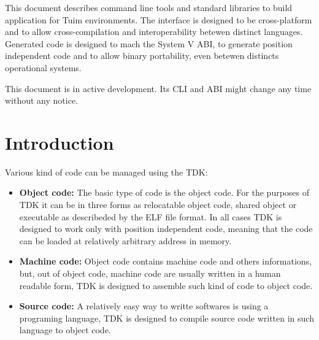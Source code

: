 \documentclass[
   article,                      %
   10pt,                         %
   openright,                    %
   oneside,                      %
   a4paper,                      %
   sumario = tradicional,        %
   english,                      %
   xcolor=table                  %
]{abntex2}
\begin{document}
\maketitle

\begin{resumoumacoluna}
   This document describes command line tools and standard libraries
   to build application for Tuim\cite{tuim} environments.
   The interface is designed to be cross-platform and
   to allow cross-compilation and interoperability betewen distinct
   languages.
   Generated code is designed to mach the System V ABI\cite{systemv},
   to generate position independent code and to allow binary portability,
   even betewen distincts operational systems.

   This document is in active development.
   Its CLI and ABI might change any time without any notice.
\end{resumoumacoluna}

\newpage
\tableofcontents
\newpage
\textual

\section{Introduction}

Various kind of code can be managed using the TDK:

\begin{itemize}
\item \textbf{Object code:}
   The basic type of code is the object code.
   For the purposes of TDK it can be in three forms
   as relocatable object code, shared object or executable
   as describeded by the ELF file format\cite{systemv}.
   In all cases TDK is designed to work only with position independent code,
   meaning that the code can be loaded at
   relatively arbitrary address in memory.
\item \textbf{Machine code:}
   Object code contains machine code and others informations,
   but, out of object code, machine code are usually written in a 
   human readable form, TDK is designed to assemble such kind of code
   to object code.
\item \textbf{Source code:}
   A relatively easy way to writte softwares is using a programing language,
   TDK is designed to compile source code written in such language to
   object code.
\end{itemize}
\end{document}

